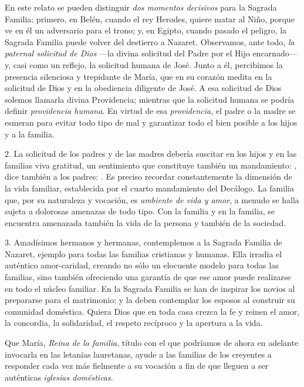 En este relato se pueden distinguir \emph{dos momentos decisivos} para la Sagrada Familia: primero, en Belén, cuando el rey Herodes, quiere matar al Niño, porque ve en él un adversario para el trono; y, en Egipto, cuando pasado el peligro, la Sagrada Familia puede volver del destierro a Nazaret. Observamos, ante todo, \emph{la paternal solicitud de Dios} ---la divina solicitud del Padre por el Hijo encarnado--- y, casi como un reflejo, la solicitud humana de José. Junto a él, percibimos la presencia silenciosa y trepidante de María, que en su corazón medita en la solicitud de Dios y en la obediencia diligente de José. A esa solicitud de Dios solemos llamarla divina Providencia; mientras que la solicitud humana se podría definir \emph{providencia humana}. En virtud de esa \emph{providencia}, el padre o la madre se esmeran para evitar todo tipo de mal y garantizar todo el bien posible a los hijos y a la familia.

2. La solicitud de los padres y de las madres debería suscitar en los hijos y en las familias viva gratitud, un sentimiento que constituye también un mandamiento: , dice también a los padres: . Es preciso recordar constantemente la dimensión de la vida familiar, establecida por el cuarto mandamiento del Decálogo. La familia que, por su naturaleza y vocación, es \emph{ambiente de vida y amor}, a menudo se halla sujeta a dolorosas amenazas de todo tipo. Con la familia y en la familia, se encuentra amenazada también la vida de la persona y también de la sociedad.

3. Amadísimos hermanos y hermanas, contemplemos a la Sagrada Familia de Nazaret, ejemplo para todas las familias cristianas y humanas. Ella irradia el auténtico amor-caridad, creando no sólo un elocuente modelo para todas las familias, sino también ofreciendo una garantía de que ese amor puede realizarse en todo el núcleo familiar. En la Sagrada Familia se han de inspirar los novios al prepararse para el matrimonio; y la deben contemplar los esposos al construir su comunidad doméstica. Quiera Dios que en toda casa crezca la fe y reinen el amor, la concordia, la solidaridad, el respeto recíproco y la apertura a la vida.

Que María, \emph{Reina de la familia}, título con el que podríamos de ahora en adelante invocarla en las letanías lauretanas, ayude a las familias de los creyentes a responder cada vez más fielmente a su vocación a fin de que lleguen a ser auténticas \emph{iglesias domésticas}.

